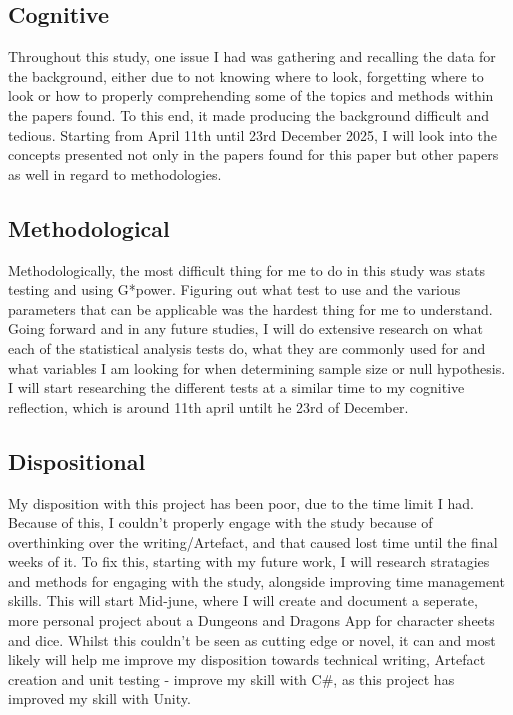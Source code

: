 \documentclass[conference]{IEEEtran}
\begin{document}
\subsection{Cognitive}
Throughout this study, one issue I had was gathering and recalling the data for the background, either due to not knowing where to look, forgetting where to look or how to properly comprehending some of the topics and methods within the papers found. To this end, it made producing the background difficult and tedious. Starting from April 11th until 23rd December 2025, I will look into the concepts presented not only in the papers found for this paper but other papers as well in regard to methodologies. 

\subsection{Methodological}
Methodologically, the most difficult thing for me to do in this study was stats testing and using G*power. Figuring out what test to use and the various parameters that can be applicable was the hardest thing for me to understand. Going forward and in any future studies, I will do extensive research on what each of the statistical analysis tests do, what they are commonly used for and what variables I am looking for when determining sample size or null hypothesis. I will start researching the different tests at a similar time to my cognitive reflection, which is around 11th april untilt he 23rd of December.

\subsection{Dispositional}
My disposition with this project has been poor, due to the time limit I had. Because of this, I couldn't properly engage with the study because of overthinking over the writing/Artefact, and that caused lost time until the final weeks of it. To fix this, starting with my future work, I will research stratagies and methods for engaging with the study, alongside improving time management skills.  This will start Mid-june, where I will create and document a seperate, more personal project about a Dungeons and Dragons App for character sheets and dice. Whilst this couldn't be seen as cutting edge or novel, it can and most likely will help me improve my disposition towards technical writing, Artefact creation and unit testing - improve my skill with C\#, as this project has improved my skill with Unity.
\end{document}
